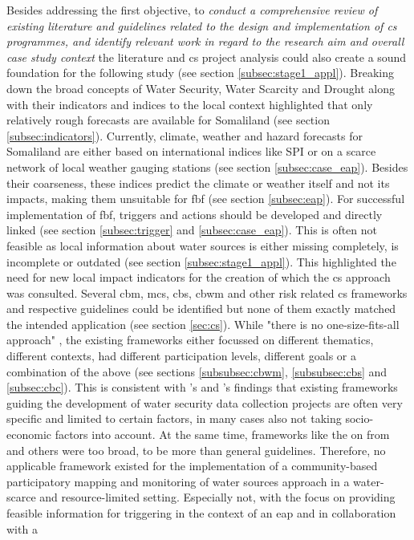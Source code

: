 Besides addressing the first objective, to \textit{conduct a comprehensive review of existing literature and guidelines related to the design and implementation of \acrlong{cs} programmes, and identify relevant work in regard to the research aim and overall case study context} the literature and \acrshort{cs} project analysis could also create a sound foundation for the following study (see section \ref{subsec:stage1_appl}). %
Breaking down the broad concepts of Water Security, Water Scarcity and Drought along with their indicators and indices to the local context highlighted that only relatively rough forecasts are available for Somaliland (see section \ref{subsec:indicators}). Currently, climate, weather and hazard forecasts for Somaliland are either based on international indices like SPI or on a scarce network of local weather gauging stations (see section \ref*{subsec:case_eap}). Besides their coarseness, these indices predict the climate or weather itself and not its impacts, making them unsuitable for \acrlong{fbf} (see section \ref*{subsec:eap}). For successful implementation of \acrshort{fbf}, triggers and actions should be developed and directly linked (see section \ref{subsec:trigger} and \ref{subsec:case_eap}). This is often not feasible as local information about water sources is either missing completely, is incomplete or outdated (see section \ref{subsec:stage1_appl}). This highlighted the need for new local impact indicators for the creation of which the \acrshort{cs} approach was consulted. Several \acrshort{cbm}, \acrshort{mcs}, \acrshort{cbs}, \acrshort{cbwm} and other risk related \acrshort{cs} frameworks and respective guidelines could be identified but none of them exactly matched the intended application (see section \ref{sec:cs}). While "there is no one-size-fits-all approach" \autocite[2]{fraislCitizenScienceEnvironmental2022}, the existing frameworks either focussed on different thematics, different contexts, had different participation levels, different goals or a combination of the above (see sections \ref{subsubsec:cbwm}, \ref{subsubsec:cbs} and \ref{subsec:cbc}). This is consistent with \autocite{butteFrameworkWaterSecurity2022}'s and \autocite{carrionCROWDSOURCINGWATERQUALITY2020}'s findings that existing frameworks guiding the development of water security data collection projects are often very specific and limited to certain factors, in many cases also not taking socio-economic factors into account. At the same time, frameworks like the on from \autocite{butteFrameworkWaterSecurity2022,eu-citizen.scienceEUCitizenScience,citizenscience.govBasicStepsYour} and others were too broad, to be more than general guidelines. Therefore, no applicable framework existed for the implementation of a community-based participatory mapping and monitoring of water sources approach in a water-scarce and resource-limited setting. Especially not, with the focus on providing feasible information for triggering  in the context of an \acrshort{eap} and in collaboration with a 